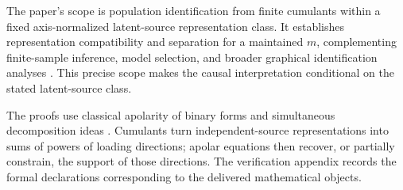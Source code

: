 The paper's scope is population identification from finite cumulants within a fixed axis-normalized latent-source representation class. It establishes representation compatibility and separation for a maintained \(m\), complementing finite-sample inference, model selection, and broader graphical identification analyses \citep{Pearl2009,SpirtesGlymourScheines2001,PetersJanzingScholkopf2017,RichardsonSpirtes2002}. This precise scope makes the causal interpretation conditional on the stated latent-source class.

The proofs use classical apolarity of binary forms and simultaneous decomposition ideas \citep{ComonMourrain1996,Landsberg2012}. Cumulants turn independent-source representations into sums of powers of loading directions; apolar equations then recover, or partially constrain, the support of those directions. The verification appendix records the formal declarations corresponding to the delivered mathematical objects.
